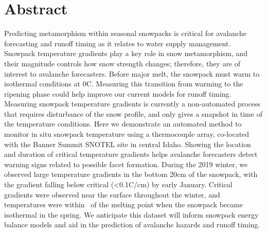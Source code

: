 \chapter*{Abstract}

Predicting metamorphism within seasonal snowpacks is critical for avalanche forecasting and runoff timing as it relates to water supply management. Snowpack temperature gradients play a key role in snow metamorphism, and their magnitude controls how snow strength changes; therefore, they are of interest to avalanche forecasters. Before major melt, the snowpack must warm to isothermal conditions at 0\textdegree C. Measuring this transition from warming to the ripening phase could help improve our current models for runoff timing. Measuring snowpack temperature gradients is currently a non-automated process that requires disturbance of the snow profile, and only gives a snapshot in time of the temperature conditions. Here we demonstrate an automated method to monitor in situ snowpack temperature using a thermocouple array, co-located with the Banner Summit SNOTEL site in central Idaho. Showing the location and duration of critical temperature gradients helps avalanche forecasters detect warning signs related to possible facet formation. During the 2019 winter, we observed large temperature gradients in the bottom 20cm of the snowpack, with the gradient falling below critical (\textless 0.1\textdegree C/cm) by early January. Critical gradients were observed near the surface throughout the winter, and temperatures were within \isostd \ of the melting point when the snowpack became isothermal in the spring. We anticipate this dataset will inform snowpack energy balance models and aid in the prediction of avalanche hazards and runoff timing.


